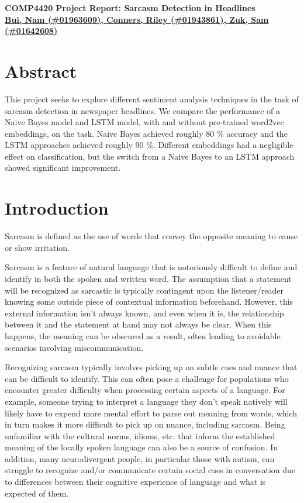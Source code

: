 \documentclass[11pt]{article}
\def\proptitle{COMP4420 Project Report: Sarcasm Detection in Headlines}
\def\propauthors{Bui, Nam (\#01963609), 
                 Conners, Riley (\#01943861), 
                 Zuk, Sam (\#01642608)}
\begin{document}
\begin{center}
    \textbf{\Large{\proptitle}} \\
    \textbf{\underline{\propauthors}}
\end{center}

\bigskip

\section{Abstract}

This project seeks to explore different sentiment analysis techniques
in the task of sarcasm detection in newspaper headlines.
We compare the performance of a Naive Bayes model
and LSTM model, with and without pre-trained word2vec embeddings,
on the task.
Naive Bayes achieved roughly 80 \% accuracy
and the LSTM approaches achieved roughly 90 \%.
Different embeddings had a negligible effect on classification,
but the switch from a Naive Bayes to an LSTM approach showed significant improvement.

\section{Introduction}

Sarcasm is defined as the use of words that convey the opposite meaning
to cause or show irritation. \cite{mw:sarcasm}

Sarcasm is a feature of natural language that is notoriously difficult to
define and identify in both the spoken and written word.
The assumption that a statement will be recognized as sarcastic
is typically contingent upon the listener/reader knowing
some outside piece of contextual information beforehand.
However, this external information isn't always known, and even when it is,
the relationship between it and the statement at hand may not always be clear.
When this happens, the meaning can be obscured as a result,
often leading to avoidable scenarios involving miscommunication.

Recognizing sarcasm typically involves picking up on subtle cues and nuance
that can be difficult to identify. This can often pose a challenge for
populations who encounter greater difficulty when processing certain aspects of
a language. For example, someone trying to interpret a language they don't
speak natively will likely have to expend more mental effort to parse out
meaning from words, which in turn makes it more difficult to pick up on nuance,
including sarcasm. Being unfamiliar with the cultural norms, idioms, etc. that
inform the established meaning of the locally spoken language can also be a
source of confusion. In addition, many neurodivergent people, in particular
those with autism, can struggle to recognize and/or communicate certain social
cues in conversation due to differences between their cognitive experience of
language and what is expected of them.
\end{document}
